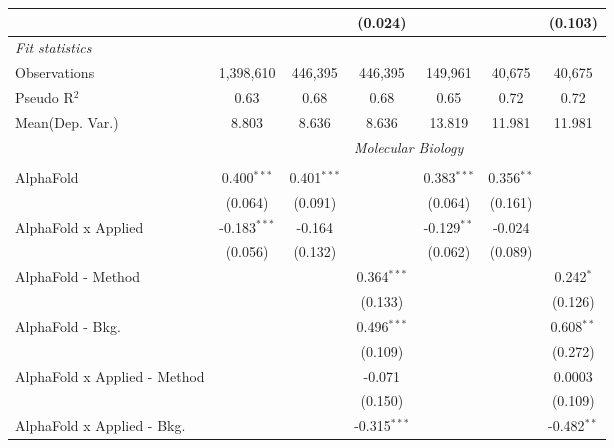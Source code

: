 \begin{tabular}{lcccccc}
                                  &                &               & (0.024)        &                &               & (0.103)\\   
   \midrule
   \emph{Fit statistics}\\
   Observations                   & 1,398,610      & 446,395       & 446,395        & 149,961        & 40,675        & 40,675\\  
   Pseudo R$^2$                   & 0.63           & 0.68          & 0.68           & 0.65           & 0.72          & 0.72\\  
Mean(Dep. Var.) & 8.803 & 8.636 & 8.636 & 13.819 & 11.981 & 11.981 \\
   
 & \multicolumn{6}{c}{\textit{Molecular Biology}} \\ \\
   AlphaFold                      & 0.400$^{***}$  & 0.401$^{***}$ &                & 0.383$^{***}$  & 0.356$^{**}$ &   \\   
                                  & (0.064)        & (0.091)       &                & (0.064)        & (0.161)      &   \\   
   AlphaFold x Applied            & -0.183$^{***}$ & -0.164        &                & -0.129$^{**}$  & -0.024       &   \\   
                                  & (0.056)        & (0.132)       &                & (0.062)        & (0.089)      &   \\   
   AlphaFold - Method             &                &               & 0.364$^{***}$  &                &              & 0.242$^{*}$\\   
                                  &                &               & (0.133)        &                &              & (0.126)\\   
   AlphaFold - Bkg.               &                &               & 0.496$^{***}$  &                &              & 0.608$^{**}$\\   
                                  &                &               & (0.109)        &                &              & (0.272)\\   
   AlphaFold x Applied - Method   &                &               & -0.071         &                &              & 0.0003\\   
                                  &                &               & (0.150)        &                &              & (0.109)\\   
   AlphaFold x Applied - Bkg.     &                &               & -0.315$^{***}$ &                &              & -0.482$^{**}$\\   

\end{tabular}
